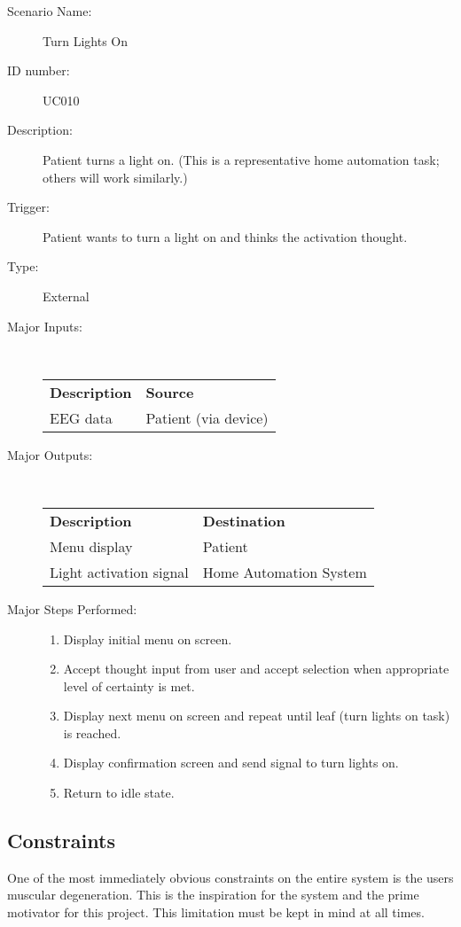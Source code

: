 \documentclass{article}
\begin{document}
\begin{description}
    \item[Scenario Name:] Turn Lights On
    \item[ID number:] UC010
    \item[Description:] Patient turns a light on. (This is a representative
        home automation task; others will work similarly.)
    \item[Trigger:] Patient wants to turn a light on and thinks the activation thought.
    \item[Type:] External
    \item[Major Inputs:] \hfill \\
        \begin{tabular}{l l}
            \textbf{Description} & \textbf{Source} \\
            EEG data & Patient (via device) \\
        \end{tabular}
    \item[Major Outputs:] \hfill \\
        \begin{tabular}{l l}
            \textbf{Description} & \textbf{Destination} \\
            Menu display & Patient \\
            Light activation signal & Home Automation System
        \end{tabular}
    \item[Major Steps Performed:] \hfill
        \begin{enumerate}
            \item Display initial menu on screen.
            \item Accept thought input from user and accept selection when
                appropriate level of certainty is met.
            \item Display next menu on screen and repeat until leaf (turn
                lights on task) is reached.
            \item Display confirmation screen and send signal to turn lights
                on.
            \item Return to idle state.
        \end{enumerate}
\end{description}

\subsection{Constraints}
One of the most immediately obvious constraints on the entire system is the
users muscular degeneration. This is the inspiration for the system and the
prime motivator for this project. This limitation must be kept in mind at
all times.
\end{document}
